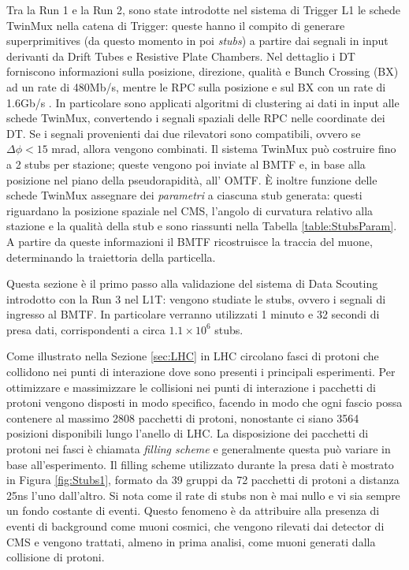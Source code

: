 Tra la Run 1 e la Run 2, sono state introdotte nel sistema di Trigger L1 le schede TwinMux nella catena di Trigger: queste hanno il compito di generare superprimitives (da questo momento in poi \textit{stubs}) a partire dai segnali in input derivanti da Drift Tubes e Resistive Plate Chambers. \newline
Nel dettaglio i DT forniscono informazioni sulla posizione, direzione, qualità e Bunch Crossing (BX) ad un rate di 480Mb/s, mentre le RPC sulla posizione e sul BX con un rate di 1.6Gb/s \cite{CERNsummerSchool}.\newline
In particolare sono applicati algoritmi di clustering ai dati in input alle schede TwinMux, convertendo i segnali spaziali delle RPC nelle coordinate dei DT. Se i segnali provenienti dai due rilevatori sono compatibili, ovvero se $\Delta \phi < 15$ \si{mrad}, allora vengono combinati.
Il sistema TwinMux può costruire fino a 2 stubs per stazione; queste vengono poi inviate al BMTF e, in base alla posizione nel piano della pseudorapidità, all' OMTF. \newline
È inoltre funzione delle schede TwinMux assegnare dei \textit{parametri} a ciascuna stub generata: questi riguardano la posizione spaziale nel CMS, l'angolo di curvatura relativo alla stazione e la qualità della stub e sono riassunti nella Tabella \ref{table:StubsParam}. A partire da queste informazioni il BMTF ricostruisce la traccia del muone, determinando la traiettoria della particella. 

Questa sezione è il primo passo alla validazione del sistema di Data Scouting introdotto con la Run 3 nel L1T: vengono studiate le stubs, ovvero i segnali di ingresso al BMTF. In particolare verranno utilizzati 1 minuto e 32 secondi di presa dati, corrispondenti a circa $1.1 \times 10^{6}$ stubs. 

Come illustrato nella Sezione \ref{sec:LHC} in LHC circolano fasci di protoni che collidono nei punti di interazione dove sono presenti i principali esperimenti. Per ottimizzare e massimizzare le collisioni nei punti di interazione i pacchetti di protoni vengono disposti in modo specifico, facendo in modo che ogni fascio possa contenere al massimo 2808 pacchetti di protoni, nonostante ci siano 3564 posizioni disponibili lungo l'anello di LHC. La disposizione dei pacchetti di protoni nei fasci è chiamata \textit{filling scheme} e generalmente questa può variare in base all'esperimento. Il filling scheme utilizzato durante la presa dati è mostrato in Figura \ref{fig:Stubs1}, formato da 39 gruppi da 72 pacchetti di protoni a distanza 25ns l'uno dall'altro\cite{Bailey}. \newline
Si nota come il rate di stubs non è mai nullo e vi sia sempre un fondo costante di eventi. Questo fenomeno è da attribuire alla presenza di eventi di background come muoni cosmici, che vengono rilevati dai detector di CMS e vengono trattati, almeno in prima analisi, come muoni generati dalla collisione di protoni.



